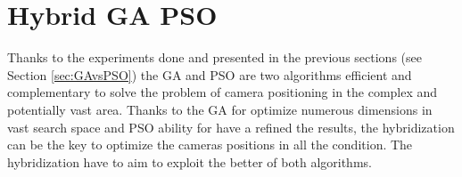  







\section{Hybrid GA PSO }\label{sec:hybridGAPSO}
 

Thanks to the experiments done and presented in the previous sections (see  Section \ref{sec:GAvsPSO}) the GA and PSO are two algorithms efficient and complementary to solve the problem of camera positioning in the complex and potentially vast area. 
Thanks to the GA for optimize numerous dimensions in vast search space and PSO ability for have a refined the results,
 the hybridization can be the key to optimize the cameras positions in all the condition. The hybridization  have to aim to exploit the better of both algorithms. 

